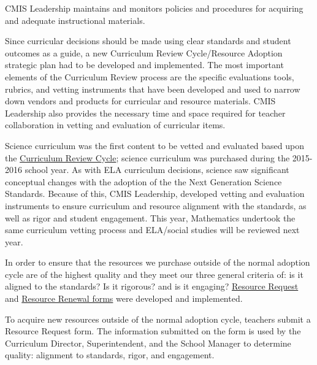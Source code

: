 \begin{findings}
CMIS Leadership maintains and monitors policies and procedures for acquiring and adequate instructional materials. 


Since curricular decisions should be made using clear standards and student outcomes as a guide, a new Curriculum Review Cycle/Resource Adoption strategic plan had to be developed and implemented. The most important elements of the Curriculum Review process are the specific evaluations tools, rubrics, and vetting instruments that have been developed and used to narrow down vendors and products for curricular and resource materials. CMIS Leadership also provides the necessary time and space required for teacher collaboration in vetting and evaluation of curricular items. 

Science curriculum was the first content to be vetted and evaluated based upon the \href{https://docs.google.com/document/d/1hh1nLUlJgg1hd7s6aG3u3We0L6o7Wg_ECdjc2f6DcT8/edit}{Curriculum Review Cycle}; science curriculum was purchased during the 2015-2016 school year. As with ELA curriculum decisions, science saw significant conceptual changes with the adoption of the the Next Generation Science Standards. Because of this, CMIS Leadership, developed vetting and evaluation instruments to ensure curriculum and resource alignment with the standards, as well as rigor and student engagement. This year, Mathematics undertook the same curriculum vetting process and ELA/social studies will be reviewed next year. 

In order to ensure that the resources we purchase outside of the normal adoption cycle are of the highest quality and they meet our three general criteria of: is it aligned to the standards? Is it rigorous? and is it engaging? \href{https://docs.google.com/a/cmis.ac.th/forms/d/e/1FAIpQLSfyvc6GwQkO6mVo-x6Lani_ezs_ZnHfgG_EgiPXXJbmkxt19g/viewform?c=0&w=1}{Resource Request} and \href{https://docs.google.com/a/cmis.ac.th/forms/d/e/1FAIpQLSd7lRTi5wYEb9tdis-jbgqyoo3poS_TdJCWU_2BQkKJknAvFA/viewform?c=0&w=1}{Resource Renewal forms} were developed and implemented. 

To acquire new resources outside of the normal adoption cycle, teachers submit a Resource Request form. The information submitted on the form is used by the Curriculum Director, Superintendent, and the School Manager to determine quality: alignment to standards, rigor, and engagement. 


\end{findings}
